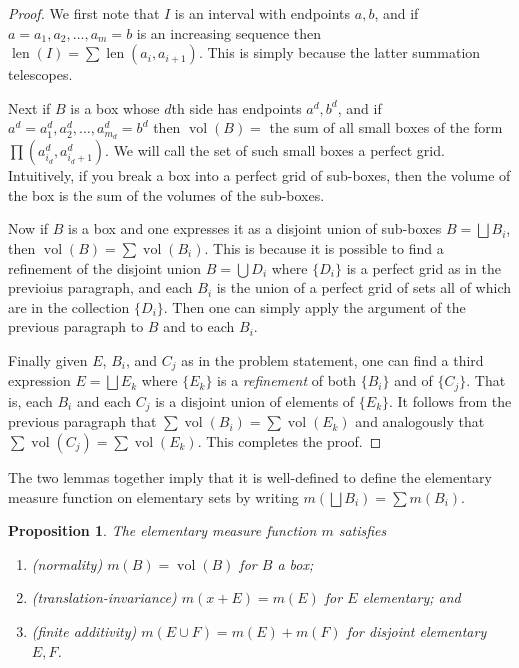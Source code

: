 \documentclass[11pt,oneside]{amsbook}
\DeclareMathOperator{\len}{len}
\DeclareMathOperator{\vol}{vol}
\theoremstyle{definition}
\theoremstyle{plain}
\newtheorem{prop}[thm]{Proposition}
\theoremstyle{definition}
\theoremstyle{remark}
\numberwithin{equation}{section}
\numberwithin{figure}{section}
\begin{document}
\begin{proof}
  We first note that $I$ is an interval with endpoints $a,b$, and if $a=a_1,a_2,\ldots,a_m=b$ is an increasing sequence then $\len(I)=\sum\len(a_i,a_{i+1})$. This is simply because the latter summation telescopes.
  
  Next if $B$ is a box whose $d$th side has endpoints $a^d,b^d$, and if $a^d=a_1^d,a_2^d,\ldots,a_{m_d}^d=b^d$ then $\vol(B)=$ the sum of all small boxes of the form $\prod(a_{i_d}^d,a_{i_d+1}^d)$. We will call the set of such small boxes a perfect grid. Intuitively, if you break a box into a perfect grid of sub-boxes, then the volume of the box is the sum of the volumes of the sub-boxes.

  Now if $B$ is a box and one expresses it as a disjoint union of sub-boxes $B=\bigsqcup B_i$, then $\vol(B)=\sum\vol(B_i)$. This is because it is possible to find a refinement of the disjoint union $B=\bigcup D_i$ where $\{D_i\}$ is a perfect grid as in the previoius paragraph, and each $B_i$ is the union of a perfect grid of sets all of which are in the collection $\{D_i\}$. Then one can simply apply the argument of the previous paragraph to $B$ and to each $B_i$.

  Finally given $E$, $B_i$, and $C_j$ as in the problem statement, one can find a third expression $E=\bigsqcup E_k$ where $\{E_k\}$ is a \emph{refinement} of both $\{B_i\}$ and of $\{C_j\}$. That is, each $B_i$ and each $C_j$ is a disjoint union of elements of $\{E_k\}$. It follows from the previous paragraph that $\sum\vol(B_i)=\sum\vol(E_k)$ and analogously that $\sum\vol(C_j)=\sum\vol(E_k)$. This completes the proof.
\end{proof}

The two lemmas together imply that it is well-defined to define the elementary measure function on elementary sets by writing $m(\bigsqcup B_i)=\sum m(B_i)$.

\begin{prop}
  The elementary measure function $m$ satisfies
  \begin{enumerate}
  \item (normality) $m(B)=\vol(B)$ for $B$ a box;
  \item (translation-invariance) $m(x+E)=m(E)$ for $E$ elementary; and
  \item (finite additivity) $m(E\cup F)=m(E)+m(F)$ for disjoint elementary $E,F$.
  \end{enumerate}
\end{prop}
\end{document}
